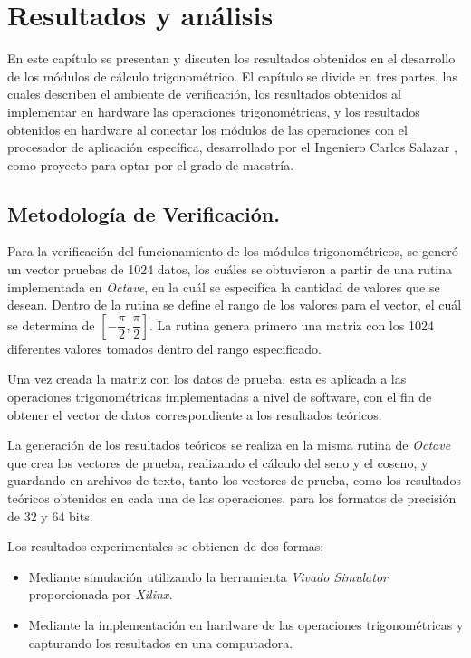 \chapter{Resultados y análisis}

En este capítulo se presentan y discuten los resultados obtenidos en el desarrollo de los módulos de cálculo trigonométrico. El capítulo se divide en tres partes, las cuales describen el ambiente de verificación, los resultados obtenidos al implementar en hardware las operaciones trigonométricas, y los resultados obtenidos en hardware al conectar los módulos de las operaciones con el procesador de aplicación específica, desarrollado por el Ingeniero Carlos Salazar , como proyecto para optar por el grado de maestría.

\section{Metodología de Verificación.}

Para la verificación del funcionamiento de los módulos trigonométricos, se generó un vector pruebas de 1024 datos, los cuáles se obtuvieron a partir de una rutina implementada en \textit{Octave}, en la cuál se especifíca la cantidad de valores que se desean. Dentro de la rutina se define el rango de los valores para el vector, el cuál se determina de $[-\dfrac{\pi}{2} ,\dfrac{\pi}{2}]$. La rutina genera primero una matriz con los 1024 diferentes valores tomados dentro del rango especificado.

Una vez creada la matriz con los datos de prueba, esta es aplicada a las operaciones trigonométricas implementadas a nivel de software, con el fin de obtener el vector de datos correspondiente a los resultados teóricos.

La generación de los resultados teóricos se realiza en la misma rutina de \textit{Octave} que crea los vectores de prueba, realizando el cálculo del seno y el coseno, y guardando en archivos de texto, tanto los vectores de prueba, como los resultados teóricos obtenidos en cada una de las operaciones, para los formatos de precisión de 32 y 64 bits.

Los resultados experimentales se obtienen de dos formas:
\begin{itemize}
	\item	Mediante simulación utilizando la herramienta \textit{Vivado Simulator} proporcionada por \textit{Xilinx.}
	\item	Mediante la implementación en hardware de las operaciones trigonométricas y capturando los resultados en una computadora.
\end{itemize}


